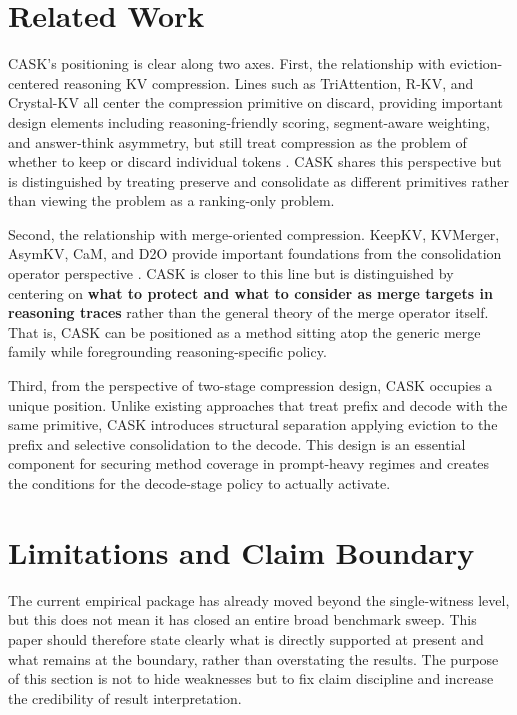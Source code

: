 \section{Related Work}


CASK's positioning is clear along two axes. First, the relationship with eviction-centered reasoning KV compression. Lines such as TriAttention, R-KV, and Crystal-KV all center the compression primitive on discard, providing important design elements including reasoning-friendly scoring, segment-aware weighting, and answer-think asymmetry, but still treat compression as the problem of whether to keep or discard individual tokens \citep{mao2026triattention,cai2025rkv,wang2026crystalkv}. CASK shares this perspective but is distinguished by treating preserve and consolidate as different primitives rather than viewing the problem as a ranking-only problem.


Second, the relationship with merge-oriented compression. KeepKV, KVMerger, AsymKV, CaM, and D2O provide important foundations from the consolidation operator perspective \citep{tian2025keepkv,wang2024kvmerger,qian2025asymkv,zhang2024cam,wan2024d2o}. CASK is closer to this line but is distinguished by centering on \textbf{what to protect and what to consider as merge targets in reasoning traces} rather than the general theory of the merge operator itself. That is, CASK can be positioned as a method sitting atop the generic merge family while foregrounding reasoning-specific policy.


Third, from the perspective of two-stage compression design, CASK occupies a unique position. Unlike existing approaches that treat prefix and decode with the same primitive, CASK introduces structural separation applying eviction to the prefix and selective consolidation to the decode. This design is an essential component for securing method coverage in prompt-heavy regimes and creates the conditions for the decode-stage policy to actually activate.


\section{Limitations and Claim Boundary}


The current empirical package has already moved beyond the single-witness level, but this does not mean it has closed an entire broad benchmark sweep. This paper should therefore state clearly what is directly supported at present and what remains at the boundary, rather than overstating the results. The purpose of this section is not to hide weaknesses but to fix claim discipline and increase the credibility of result interpretation.


